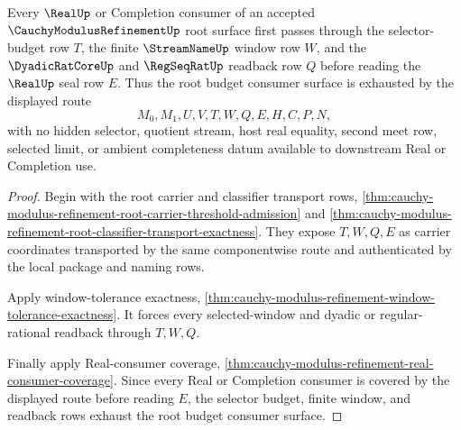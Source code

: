 \begin{theorem}
\label{thm:cauchy-modulus-refinement-root-budget-consumer-exhaustion}
Every $\RealUp$ or Completion consumer of an accepted $\CauchyModulusRefinementUp$ root surface first passes through the selector-budget row $T$, the finite $\StreamNameUp$ window row $W$, and the $\DyadicRatCoreUp$ and $\RegSeqRatUp$ readback row $Q$ before reading the $\RealUp$ seal row $E$. Thus the root budget consumer surface is exhausted by the displayed route
$$
M_0,M_1,U,V,T,W,Q,E,H,C,P,N,
$$
with no hidden selector, quotient stream, host real equality, second meet row, selected limit, or ambient completeness datum available to downstream Real or Completion use.
\end{theorem}
\begin{proof}
Begin with the root carrier and classifier transport rows, \autoref{thm:cauchy-modulus-refinement-root-carrier-threshold-admission} and \autoref{thm:cauchy-modulus-refinement-root-classifier-transport-exactness}. They expose $T,W,Q,E$ as carrier coordinates transported by the same componentwise route and authenticated by the local package and naming rows.

Apply window-tolerance exactness, \autoref{thm:cauchy-modulus-refinement-window-tolerance-exactness}. It forces every selected-window and dyadic or regular-rational readback through $T,W,Q$.

Finally apply Real-consumer coverage, \autoref{thm:cauchy-modulus-refinement-real-consumer-coverage}. Since every Real or Completion consumer is covered by the displayed route before reading $E$, the selector budget, finite window, and readback rows exhaust the root budget consumer surface.
\end{proof}

